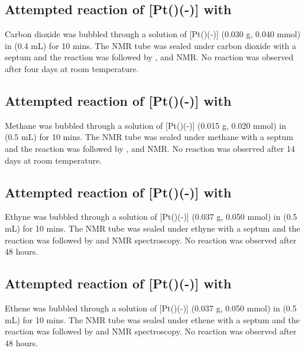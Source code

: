 
\subsection*{Attempted reaction of \texorpdfstring{[Pt(\tButhixantphos)(-)]} P with \texorpdfstring{} C}

Carbon dioxide was bubbled through a solution of [Pt(\tButhixantphos)(-)] (0.030 g, 0.040 mmol) in  (0.4 mL) for 10 mins.  The NMR tube was sealed under carbon dioxide with a septum and the reaction was followed by \proton{}, \carbon{} and \phosphorus{} NMR.  No reaction was observed after four days at room temperature.  

\subsection*{Attempted reaction of \texorpdfstring{[Pt(\tButhixantphos)(-)]} P with \texorpdfstring{} C}

Methane was bubbled through a solution of [Pt(\tButhixantphos)(-)] (0.015 g, 0.020 mmol)  in  (0.5 mL) for 10 mins.  The NMR tube was sealed under methane with a septum and the reaction was followed by \proton{}, \carbon{} and \phosphorus{} NMR.  No reaction was observed after 14 days at room temperature.

\subsection*{Attempted reaction of \texorpdfstring{[Pt(\tButhixantphos)(-)]} P with \texorpdfstring{} C}

Ethyne was bubbled through a solution of [Pt(\tButhixantphos)(-)] (0.037 g, 0.050 mmol) in  (0.5 mL) for 10 mins.  The NMR tube was sealed under ethyne with a septum and the reaction was followed by \proton{} and \phosphorus{} NMR spectroscopy.  No reaction was observed after 48 hours.

\subsection*{Attempted reaction of \texorpdfstring{[Pt(\tButhixantphos)(-)]} P with \texorpdfstring{} C}

Ethene was bubbled through a solution of [Pt(\tButhixantphos)(-)] (0.037 g, 0.050 mmol) in  (0.5 mL) for 10 mins.  The NMR tube was sealed under ethene with a septum and the reaction was followed by \proton{} and \phosphorus{} NMR spectroscopy.  No reaction was observed after 48 hours.

